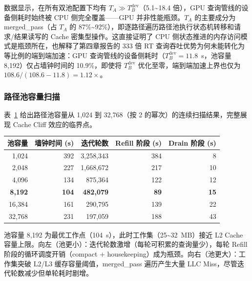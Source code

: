 数据显示，在所有双池配置下均有 $T_A \gg T_B^{\text{dev}}$（5.1\textasciitilde 18.4 倍），GPU 查询管线的设备侧耗时始终被 CPU 侧完全覆盖——GPU 并非性能瓶颈。$T_A$ 的主要成分为 merged\_pass（占 $T_A$ 的 87\%\textasciitilde 92\%），即逐路径遍历路径池执行状态机转移和请求/结果读写的 Cache 密集型操作。这直接证明了 CPU 侧状态推进的内存访问模式是瓶颈所在，也解释了第四章报告的 333 倍 RT 查询吞吐优势为何未能转化为等比例的端到端加速：GPU 查询管线的设备侧耗时（$T_B^{\text{dev}} = 11.8$~s，池容量 8{,}192）仅占墙钟时间的 10.9\%，即使将 $T_B^{\text{dev}}$ 优化至零，端到端加速上界也仅为 $108.6 / (108.6 - 11.8) = 1.12\times$。

\subsubsection{路径池容量扫描}

表~\ref{tab:pool-scan} 给出路径池容量从 1{,}024 到 32{,}768（按 2 的幂次）的连续扫描结果，完整展现 Cache Cliff 效应的临界点。

\begin{table}[htbp]
  \centering
  \label{tab:pool-scan}
  \small
  \begin{tabular}{rrrrr}
    \toprule
    池容量 & 墙钟时间 (s) & 迭代轮数 & Refill 阶段 (s) & Drain 阶段 (s) \\
    \midrule
    1{,}024  & 392 & 3{,}258{,}343 & 384 & 8 \\
    2{,}048  & 227 & 1{,}668{,}672 & 217 & 10 \\
    4{,}096  & 134 & 875{,}364    & 122 & 12 \\
    \textbf{8{,}192}  & \textbf{104} & \textbf{482{,}079} & \textbf{89} & \textbf{15} \\
    16{,}384 & 161 & 290{,}795    & 139 & 22 \\
    32{,}768 & 231 & 197{,}059    & 188 & 43 \\
    \bottomrule
  \end{tabular}
\end{table}

池容量 8{,}192 为最优工作点（104~s），此时工作集（25\textasciitilde 32~MB）接近 L2 Cache 容量上限。向左（池更小）：迭代轮数激增（每轮可积累的查询量少），每轮 Refill 阶段的循环调度开销（compact $+$ housekeeping）成为瓶颈。向右（池更大）：工作集突破 L2/L3 缓存容量阈值，merged\_pass 遍历产生大量 LLC Miss，尽管迭代轮数减少但单轮耗时剧增。

